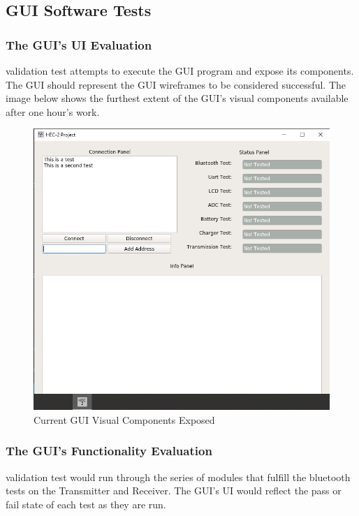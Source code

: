 \documentclass[12pt]{article}
\begin{document}
\pagebreak

\subsection{GUI Software Tests}

\subsubsection*{The GUI's UI Evaluation} validation test attempts to execute the GUI program and expose its components.  The GUI should represent the GUI wireframes to be considered successful.  The image below shows the furthest extent of the GUI's visual components available after one hour's work.

\begin{figure}[h!]
\centering
\includegraphics[width=0.95\linewidth]{gui_actual}
\caption{Current GUI Visual Components Exposed}
\end{figure}
\hfill
\subsubsection*{The GUI's Functionality Evaluation} validation test would run through the series of modules that fulfill the bluetooth tests on the Transmitter and Receiver.  The GUI's UI would reflect the pass or fail state of each test as they are run.

\hfill \\
\pagebreak
\hfill
\end{document}
